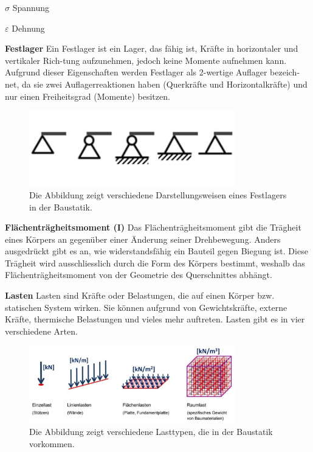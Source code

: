$σ$ Spannung

$ε$ Dehnung

\textbf{Festlager}
Ein Festlager ist ein Lager, das fähig ist, Kräfte in horizontaler und vertikaler Rich-tung aufzunehmen, jedoch keine Momente aufnehmen kann.
Aufgrund dieser Eigenschaften werden Festlager als 2-wertige Auflager bezeich-net, da sie zwei Auflagerreaktionen haben (Querkräfte und Horizontalkräfte) und nur einen Freiheitsgrad (Momente) besitzen.
\begin{figure} [h]
	\centering
	\includegraphics[width=0.8\textwidth]{papers/balken/images/teil1/Festlager.jpg}
	\caption{Die Abbildung zeigt verschiedene Darstellungsweisen eines Festlagers in der Baustatik.}
	\label{fig:Die Abbildung zeigt verschiedene Darstellungsweisen eines Festlagers in der Baustatik.}
\end{figure}

\textbf{Flächenträgheitsmoment (I)}
Das Flächenträgheitsmoment gibt die Trägheit eines Körpers an gegenüber einer Änderung seiner Drehbewegung.
Anders ausgedrückt gibt es an, wie widerstandsfähig ein Bauteil gegen Biegung ist.
Diese Trägheit wird ausschliesslich durch die Form des Körpers bestimmt, weshalb das Flächenträgheitsmoment von der Geometrie des Querschnittes abhängt.

\textbf{Lasten}
Lasten sind Kräfte oder Belastungen, die auf einen Körper bzw. statischen System wirken.
Sie können aufgrund von Gewichtskräfte, externe Kräfte, thermische Belastungen und vieles mehr auftreten.
Lasten gibt es in vier verschiedene Arten.
\begin{figure} [h]
	\centering
	\includegraphics[width=0.8\textwidth]{papers/balken/images/teil1/Lasten.jpg}
	\caption{Die Abbildung zeigt verschiedene Lasttypen, die in der Baustatik vorkommen.}
	\label{fig:Die Abbildung zeigt verschiedene Lasttypen, die in der Baustatik vorkommen.}
\end{figure}

